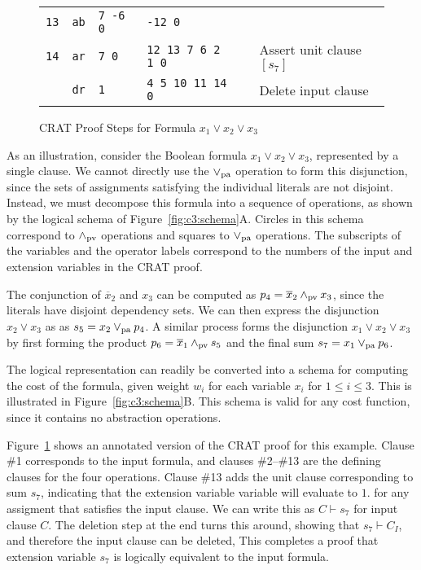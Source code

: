 \documentclass{llncs}
\newcommand{\pand}{\mathbin{\land_{\rm pv}}}
\newcommand{\por}{\mathbin{\lor_{\rm pa}}}
\newcommand{\tautology}{1}
\newcommand{\obar}[1]{\overline{#1}}
\newcommand{\turnstile}{\vdash}
\begin{document}
\begin{figure}
{\begin{tabular}{llllll}
    {\tt 13} & {\tt ab}  & {\tt  7 -6 0}    & {\tt -12 0} & &  \\  %
    {\tt 14} & {\tt ar}  & {\tt 7 0} & {\tt 12 13 7 6 2 1 0} & & Assert unit clause $[s_7]$ \\
             & {\tt dr}  & {\tt 1}  & {\tt 4 5 10 11 14 0} & & Delete input clause \\
  \end{tabular}
  }
  \caption{CRAT Proof Steps for Formula $x_1 \lor x_2 \lor x_3$}
  \label{fig:c3:crat}
\end{figure}
    
As an illustration, consider the Boolean formula $x_1 \lor x_2 \lor
x_3$, represented by a single clause.  We cannot directly use the
$\por$ operation to form this disjunction, since the sets of assignments
satisfying the individual literals are not disjoint.  Instead, we must
decompose this formula into a sequence of operations, as shown by the
logical schema of Figure~\ref{fig:c3:schema}A\@.  Circles in this schema
correspond to $\pand$ operations and squares to $\por$ operations.
The subscripts of the variables and the operator labels correspond to
the numbers of the input and extension variables in the CRAT proof.

The conjunction of $\obar{x}_2$ and $x_3$ can be computed as $p_4 =
\obar{x}_2 \pand x_3$, since the literals have disjoint dependency
sets. We can then express the disjunction $x_2 \lor x_3$ as
as $s_5 = x_2 \por p_4$.  A similar process forms the
disjunction $x_1 \lor x_2 \lor x_3$ by first forming the product $p_6
= \obar{x}_1 \pand s_5$ and the final sum $s_7 = x_1 \por p_6$.

The logical representation can readily be converted into a schema for
computing the cost of the formula, given weight $w_i$ for each
variable $x_i$ for $1 \leq i \leq 3$.  This is illustrated in
Figure~\ref{fig:c3:schema}B\@.  This schema is valid for any cost
function, since it contains no abstraction operations.

Figure~\ref{fig:c3:crat} shows an annotated version of the CRAT proof
for this example.  Clause \#1 corresponds to the input formula, and
clauses \#2--\#13 are the defining clauses for the four operations.
Clause \#13 adds the unit clause corresponding to sum $s_7$,
indicating that the extension variable variable will evaluate to
$\tautology$.  for any assigment that satisfies the input clause.  We
can write this as $C \turnstile  s_7$ for input clause $C$.  The
deletion step at the end turns this around, showing that
$s_7 \turnstile C_I$, and therefore the input clause can be deleted,
This completes a proof that extension variable $s_7$ is logically
equivalent to the input formula.
\end{document}
